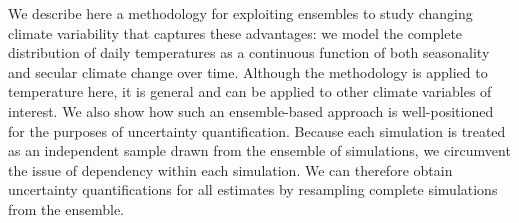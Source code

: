 \documentclass{ametsoc}
\begin{document}






We describe here a methodology for exploiting ensembles %
 to study changing climate variability 
that captures these advantages:  we model the complete distribution of daily temperatures as a continuous function of both seasonality and secular climate change over time. Although the methodology is applied to temperature here, it is general and can be applied to other climate variables of interest. We also show how such an ensemble-based approach is well-positioned for the purposes of uncertainty quantification. Because each simulation is treated as an independent sample drawn from the ensemble of simulations, we circumvent the issue of dependency within each simulation. We can therefore obtain uncertainty quantifications for all estimates by resampling complete simulations from the ensemble.  
\end{document}
